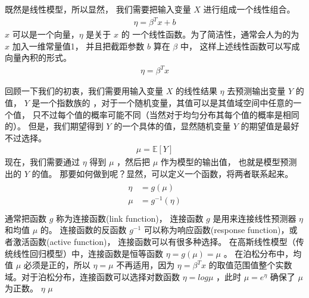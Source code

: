 \documentclass[letterpaper,10pt,english]{sphinxmanual}
\begin{document}

既然是线性模型，所以显然，
我们需要把输入变量 \(X\) 进行组成一个线性组合。
\begin{equation}\label{equation:广义线性模型/content:广义线性模型/content:13}
\begin{split}\eta = \beta^T x + b\end{split}
\end{equation}
\(x\) 可以是一个向量，\(\eta\) 是关于 \(x\) 的
一个线性函数。为了简洁性，通常会人为的为 \(x\) 加入一维常量值1，
并且把截距参数 \(b\) 算在 \(\beta\) 中，
这样上述线性函数可以写成向量內积的形式。
\begin{equation}\label{equation:广义线性模型/content:广义线性模型/content:14}
\begin{split}\eta = \beta^T x\end{split}
\end{equation}

回顾一下我们的初衷，我们需要用输入变量 \(X\) 的线性结果 \(\eta\) 去预测输出变量 \(Y\) 的值，
\(Y\) 是一个指数族的  ，对于一个随机变量，其值可以是其值域空间中任意的一个值，
只不过每个值的概率可能不同（当然对于均匀分布其每个值的概率是相同的）。
但是，我们期望得到 \(Y\) 的一个具体的值，显然随机变量 \(Y\) 的期望值是最好不过选择。
\begin{equation}\label{equation:广义线性模型/content:广义线性模型/content:15}
\begin{split}\mu = \mathbb{E}[Y]\end{split}
\end{equation}
现在，我们需要通过 \(\eta\) 得到 \(\mu\) ，然后把 \(\mu\) 作为模型的输出值，
也就是模型预测出的 \(Y\) 的值。
那要如何做到呢？显然，可以定义一个函数，将两者联系起来。
\begin{align}\label{equation:广义线性模型/content:广义线性模型/content:16}\!\begin{aligned}
\eta &= g(\mu)\\
\mu &= g^{-1}(\eta)\\
\end{aligned}\end{align}
通常把函数 \(g\) 称为连接函数(link function)，
连接函数 \(g\) 是用来连接线性预测器 \(\eta\) 和均值 \(\mu\) 的。
连接函数的反函数 \(g^{-1}\) 可以称为响应函数(response function)，或者激活函数(active function)，
连接函数可以有很多种选择。
在高斯线性模型（传统线性回归模型）中，连接函数是恒等函数 \(\eta=g(\mu)=\mu\) 。
在泊松分布中，均值 \(\mu\) 必须是正的，所以 \(\eta=\mu\) 不再适用，因为 \(\eta=\beta^Tx\)
的取值范围值整个实数域。对于泊松分布，连接函数可以选择对数函数 \(\eta=log \mu\) ，此时 \(\mu=e^{\eta}\)
确保了 \(\mu\) 为正数。
 \(\eta\)  \(\mu\) 
\end{document}
